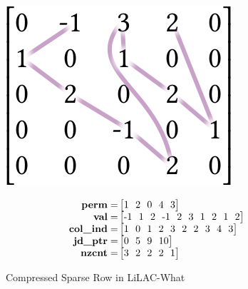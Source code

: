 \begin{figure}[t]
\vspace{-1.2em}
\caption{Compressed Sparse Row in LiLAC-What}
\label{csr_lilacwhat_fig}
\vspace{1.5em}
\centering
\begin{minipage}[b]{0.3\linewidth}
\includegraphics[width=0.9\linewidth]{figures/jdsorder.png}
\vspace{0.04em}
\end{minipage}
\begin{minipage}[b]{0.65\linewidth}
\footnotesize
\begin{align*}
\text{\bf perm} =& \begin{bmatrix}1\ \ 2\ \ 0\ \ 4\ \ 3\\\end{bmatrix}\\[-0.4em]
\text{\bf val} =& \begin{bmatrix}\text{-}1\ \ 1\ \ 2\ \ \text{-}1\ \ 2\ \ 3\ \ 1\ \ 2\ \ 1\ \ 2\\\end{bmatrix}\\[-0.4em]
\text{\bf col\_ind} =& \begin{bmatrix}1\ \ 0\ \ 1\ \ 2\ \ 3\ \ 2\ \ 2\ \ 3\ \ 4\ \ 3\\\end{bmatrix}\\[-0.4em]
\text{\bf jd\_ptr} =& \begin{bmatrix}0\ \ 5\ \ 9\ \ 10\\\end{bmatrix}\\[-0.4em]
\text{\bf nzcnt} =& \begin{bmatrix}3\ \ 2\ \ 2\ \ 2\ \ 1\end{bmatrix}

\end{align*}
\end{minipage}
\end{figure}
